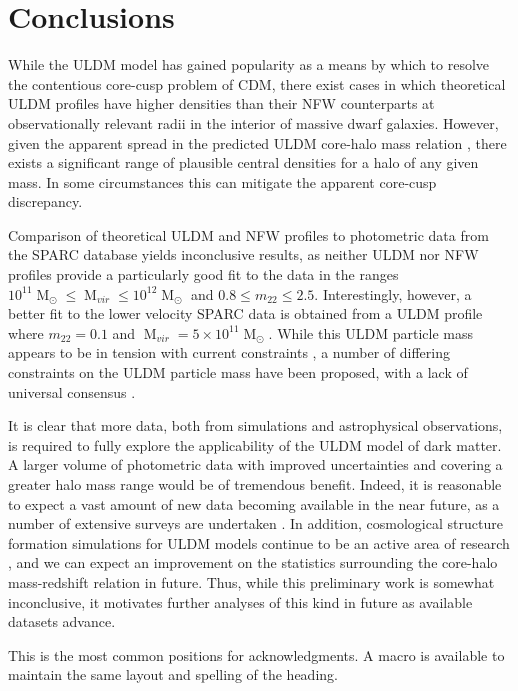 \documentclass[a4paper,11pt]{article}
\begin{document}
\section{Conclusions}

While the ULDM model has gained popularity as a means by which to resolve the contentious core-cusp problem of CDM, there exist cases in which theoretical ULDM profiles have higher densities than their NFW counterparts at observationally relevant radii in the interior of massive dwarf galaxies. However, given the apparent spread in the predicted ULDM core-halo mass relation \cite{Schive:2014hza}, there exists a significant range of plausible central densities for a halo of any given mass. In some circumstances this can mitigate the apparent core-cusp discrepancy. 

Comparison of theoretical ULDM and NFW profiles to photometric data from the SPARC database yields inconclusive results, as neither ULDM nor NFW profiles provide a particularly good fit to the data in the ranges $10^{11}\operatorname{M}_{\odot}\leq \operatorname{M}_{vir} \leq 10^{12}\operatorname{M}_{\odot}$ and $0.8 \leq m_{22} \leq 2.5$. Interestingly, however, a better fit to the lower velocity SPARC data is obtained from a ULDM profile where $m_{22} = 0.1$ and $\operatorname{M}_{vir} = 5\times 10^{11}\operatorname{M}_{\odot}$. While this ULDM particle mass appears to be in tension with current constraints \cite{Amendola:2005ad, Bozek:2014uqa}, a number of differing constraints on the ULDM particle mass have been proposed, with a lack of universal consensus \cite{Armengaud:2017nkf}.

It is clear that more data, both from simulations and astrophysical observations, is required to fully explore the applicability of the ULDM model of dark matter. A larger volume of photometric data with improved uncertainties and covering a greater halo mass range would be of tremendous benefit. Indeed, it is reasonable to expect a vast amount of new data becoming available in the near future, as a number of extensive surveys are undertaken \cite{Simon:2019kmm}. In addition, cosmological structure formation simulations for ULDM models continue to be an active area of research \cite{Lin:2018whl, Clough:2018exo, Mocz:2015sda}, and we can expect an improvement on the statistics surrounding the core-halo mass-redshift relation in future. Thus, while this preliminary work is somewhat inconclusive, it motivates further analyses of this kind in future as available datasets advance. 




\acknowledgments

This is the most common positions for acknowledgments. A macro is
available to maintain the same layout and spelling of the heading.






 
\end{document}
